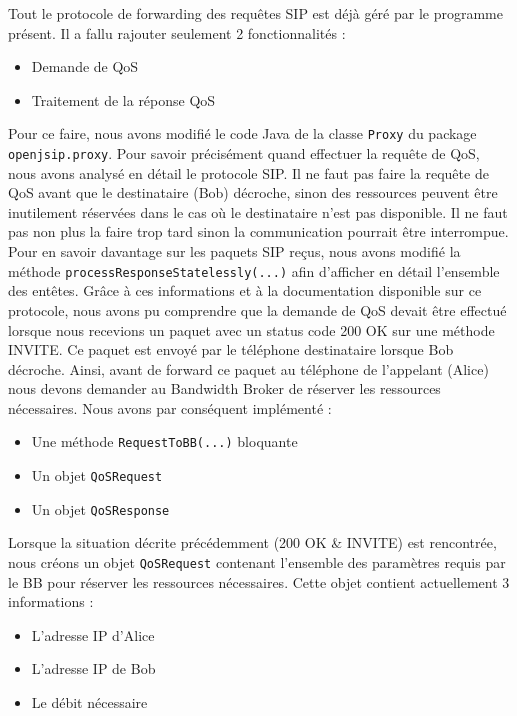 \documentclass[a4paper,11pt]{article}
\begin{document}
Tout le protocole de forwarding des requêtes SIP est déjà géré par le programme présent. Il a fallu rajouter seulement 2 fonctionnalités :
\begin{itemize}
    \item Demande de QoS
    \item Traitement de la réponse QoS
\end{itemize}


Pour ce faire, nous avons modifié le code Java de la classe \texttt{Proxy} du package \texttt{openjsip.proxy}. 
Pour savoir précisément quand effectuer la requête de QoS, nous avons analysé en détail le protocole SIP. Il ne faut pas faire la requête de QoS avant que le destinataire (Bob) décroche, sinon des ressources peuvent être inutilement réservées dans le cas où le destinataire n’est pas disponible. Il ne faut pas non plus la faire trop tard sinon la communication pourrait être interrompue.
Pour en savoir davantage sur les paquets SIP reçus, nous avons modifié la méthode \texttt{processResponseStatelessly(...)} afin d’afficher en détail l’ensemble des entêtes. Grâce à ces informations et à la documentation disponible sur ce protocole, nous avons pu comprendre que la demande de QoS devait être effectué lorsque nous recevions un paquet avec un status code 200 OK sur une méthode INVITE. Ce paquet est envoyé par le téléphone destinataire lorsque Bob décroche. Ainsi, avant de forward ce paquet au téléphone de l'appelant (Alice) nous devons demander au Bandwidth Broker de réserver les ressources nécessaires. Nous avons par conséquent implémenté :

\begin{itemize}
    \item Une méthode \texttt{RequestToBB(...)} bloquante
    \item Un objet \texttt{QoSRequest}
    \item Un objet \texttt{QoSResponse}
\end{itemize}




Lorsque la situation décrite précédemment (200 OK \& INVITE) est rencontrée, nous créons un objet \texttt{QoSRequest} contenant l’ensemble des paramètres requis par le BB pour réserver les ressources nécessaires. 
Cette objet contient actuellement 3 informations :
\begin{itemize}
    \item L’adresse IP d’Alice
    \item L’adresse IP de Bob
    \item Le débit nécessaire
\end{itemize}
\end{document}
